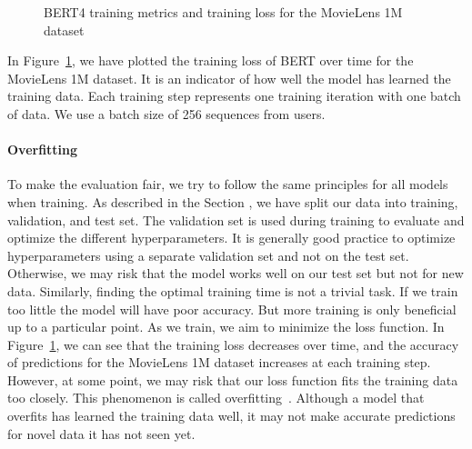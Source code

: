 \begin{figure}[htbp]
    \centering
    \caption{BERT4 training metrics and training loss for the MovieLens 1M dataset}
    \label{fig:BERT_training}
\end{figure}

In Figure~\ref{fig:BERT_training}, we have plotted the training loss of BERT over time for the MovieLens 1M dataset. It is an indicator of how well the model has learned the training data. Each training step represents one training iteration with one batch of data. We use a batch size of 256 sequences from users.

\paragraph{Overfitting}
To make the evaluation fair, we try to follow the same principles for all models when training. As described in the Section , we have split our data into training, validation, and test set. The validation set is used during training to evaluate and optimize the different hyperparameters. It is generally good practice to optimize hyperparameters using a separate validation set and not on the test set. Otherwise, we may risk that the model works well on our test set but not for new data. Similarly, finding the optimal training time is not a trivial task. If we train too little the model will have poor accuracy. But more training is only beneficial up to a particular point. As we train, we aim to minimize the loss function. In Figure~\ref{fig:BERT_training}, we can see that the training loss decreases over time, and the accuracy of predictions for the MovieLens 1M dataset increases at each training step. However, at some point, we may risk that our loss function fits the training data too closely. This phenomenon is called overfitting~\cite{hawkins2004problem}. Although a model that overfits has learned the training data well, it may not make accurate predictions for novel data it has not seen yet.

